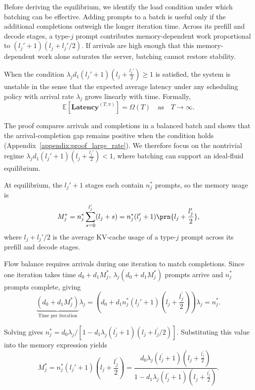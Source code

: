 Before deriving the equilibrium, we identify the load condition under which batching can be effective. Adding prompts to a batch is useful only if the additional completions outweigh the longer iteration time. Across its prefill and decode stages, a type-\(j\) prompt contributes memory-dependent work proportional to \((l_j' + 1)(l_j + l_j'/2)\). If arrivals are high enough that this memory-dependent work alone saturates the server, batching cannot restore stability.

\begin{proposition}\label{prop:large_rate}
When the condition $\lambda_j d_1 (l_j' + 1) \left( l_j + \frac{l_j'}{2} \right) \geq 1$ is satisfied, the system is unstable in the sense that the expected average latency under any scheduling policy with arrival rate \( \lambda_j \) grows linearly with time. Formally,
$$
\mathbb{E}[\textbf{Latency}^{(T,\pi)}] = \Omega(T) \quad \text{as} \quad T \to \infty.
$$
\end{proposition}

The proof compares arrivals and completions in a balanced batch and shows that the arrival-completion gap remains positive when the condition holds (Appendix~\ref{appendix:proof_large_rate}). We therefore focus on the nontrivial regime $\lambda_j d_1 (l_j' + 1) \left( l_j + \frac{l_j'}{2} \right) <1$, where batching can support an ideal-fluid equilibrium.

At equilibrium, the \(l_j'+1\) stages each contain \(n_j^*\) prompts, so the memory usage is
\begin{equation}
    M_j^* = n_j^* \sum_{s=0}^{l_j^{\prime}}(l_j+s) = n_j^*(l_j'+1)\prn{l_j+\frac{l_j'}{2}},
\end{equation}
where \(l_j+l_j'/2\) is the average KV-cache usage of a type-\(j\) prompt across its prefill and decode stages.

Flow balance requires arrivals during one iteration to match completions. Since one iteration takes time \(d_0+d_1M_j^*\), \(\lambda_j(d_0+d_1M_j^*)\) prompts arrive and \(n_j^*\) prompts complete, giving
\begin{equation}
\label{eq:single_type_equilibrium}
\underset{\text{Time per iteration}}{\underbrace{(d_0+d_1M_j^{*} )}}\lambda_j =\left(d_0+d_1 n_j^*(l_j'+1)\left( l_j +\frac{l_j^{\prime}}{2} \right) \right)\lambda_j= n_j^*.
\end{equation}

Solving gives \(n_j^* = d_0\lambda_j/[1-d_1\lambda_j(l_j^{\prime}+1)(l_j+l_j^{\prime}/2)]\). Substituting this value into the memory expression yields
\begin{equation}
    \label{eq:memory_single}
M_j^* = n_j^*(l_j'+1)\left( l_j+\frac{l_j^{\prime}}{2} \right)
=  \frac{d_0\lambda_j(l_j^{\prime}+1)\left( l_j+\frac{l_j^{\prime}}{2} \right) }{1-d_1\lambda_j(l_j^{\prime}+1)(l_j+\frac{l_j^{\prime}}{2})}.
\end{equation}

